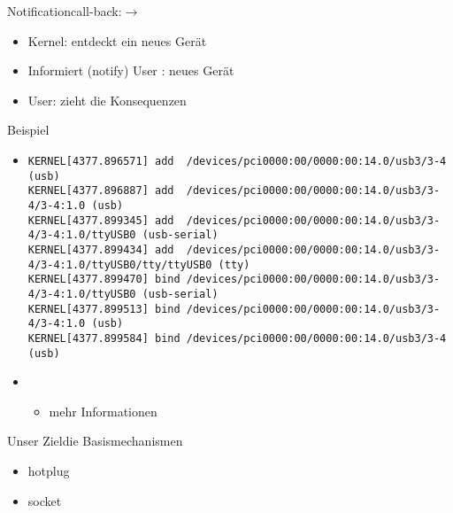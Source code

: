 \begin{frame}{Notification}{call-back:\ksp $\to$ \usp}
 \begin{itemize}
  \item Kernel: \ksp entdeckt ein neues Gerät
  \item Informiert (notify) User \usp: neues Gerät 
  \item User: \usp zieht die Konsequenzen 
 \end{itemize}
\end{frame}

\begin{frame}[fragile]{Beispiel}{}
\begin{itemize}
 \item {}

{\tiny
\begin{verbatim}
KERNEL[4377.896571] add  /devices/pci0000:00/0000:00:14.0/usb3/3-4 (usb)
KERNEL[4377.896887] add  /devices/pci0000:00/0000:00:14.0/usb3/3-4/3-4:1.0 (usb)
KERNEL[4377.899345] add  /devices/pci0000:00/0000:00:14.0/usb3/3-4/3-4:1.0/ttyUSB0 (usb-serial)
KERNEL[4377.899434] add  /devices/pci0000:00/0000:00:14.0/usb3/3-4/3-4:1.0/ttyUSB0/tty/ttyUSB0 (tty)
KERNEL[4377.899470] bind /devices/pci0000:00/0000:00:14.0/usb3/3-4/3-4:1.0/ttyUSB0 (usb-serial)
KERNEL[4377.899513] bind /devices/pci0000:00/0000:00:14.0/usb3/3-4/3-4:1.0 (usb)
KERNEL[4377.899584] bind /devices/pci0000:00/0000:00:14.0/usb3/3-4 (usb)
\end{verbatim}
}
\item {}
\begin{itemize}
 \item mehr Informationen
\end{itemize}
\end{itemize}
\end{frame}

\begin{frame}{Unser Ziel}{die Basismechanismen}
 \begin{itemize}
  \item hotplug
  \item socket 
 \end{itemize}
\end{frame}




